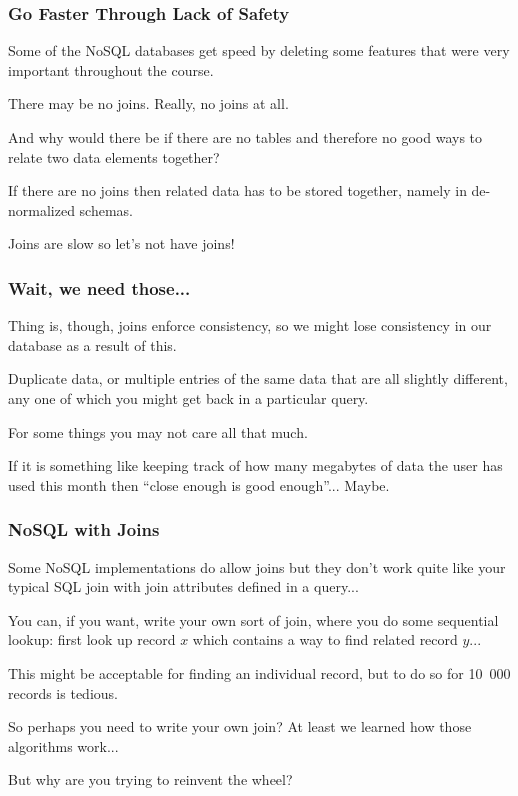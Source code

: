 \begin{frame}
\frametitle{Go Faster Through Lack of Safety}

Some of the NoSQL databases get speed by deleting some features that were very important throughout the course. 

There may be no joins. Really, no joins at all. 

And why would there be if there are no tables and therefore no good ways to relate two data elements together? 

If there are no joins then related data has to be stored together, namely in de-normalized schemas.

Joins are slow so let's not have joins!

\end{frame}


\begin{frame}
\frametitle{Wait, we need those...}

Thing is, though, joins enforce consistency, so we might lose consistency in our database as a result of this. 

Duplicate data, or multiple entries of the same data that are all slightly different, any one of which you might get back in a particular query. 

For some things you may not care all that much. 

If it is something like keeping track of how many megabytes of data the user has used this month then ``close enough is good enough''... Maybe.


\end{frame}



\begin{frame}
\frametitle{NoSQL with Joins}

Some NoSQL implementations do allow joins but they don't work quite like your typical SQL join with join attributes defined in a query... 

You can, if you want, write your own sort of join, where you do some sequential lookup: first look up record $x$ which contains a way to find related record $y$...

 This might be acceptable for finding an individual record, but to do so for 10~000 records is tedious. 
 
 So perhaps you need to write your own join? At least we learned how those algorithms work... 

But why are you trying to reinvent the wheel?

\end{frame}




